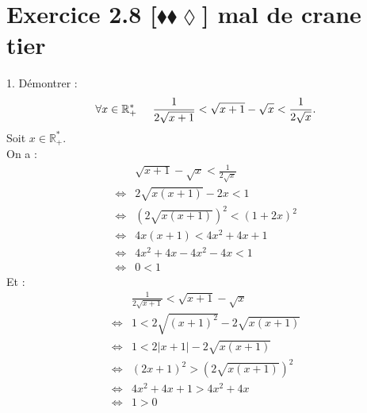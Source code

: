 \documentclass[10pt]{article}
\begin{document}
\section*{Exercice 2.8 [$\blacklozenge\blacklozenge\lozenge$] mal de crane tier}
\begin{tcolorbox}[enhanced, width=6in, center, size=fbox, fontupper=\large, drop shadow southwest]
    1. Démontrer : 
    \begin{equation*}
        \forall{x\in\mathbb{R}^*_+}\hspace{0.5cm}\frac{1}{2\sqrt{x+1}}<\sqrt{x+1}-\sqrt{x}<\frac{1}{2\sqrt{x}}.
    \end{equation*}
    Soit $x\in\mathbb{R}^*_+$.\\
    On a :
    \begin{align*}
        &\sqrt{x+1}-\sqrt{x}<\frac{1}{2\sqrt{x}}\\
        \iff&2\sqrt{x(x+1)}-2x<1\\
        \iff&(2\sqrt{x(x+1)})^2<(1+2x)^2\\
        \iff&4x(x+1)<4x^2+4x+1\\
        \iff&4x^2+4x-4x^2-4x<1\\
        \iff&0<1
    \end{align*}
    Et :
    \begin{align*}
        &\frac{1}{2\sqrt{x+1}}<\sqrt{x+1}-\sqrt{x}\\
        \iff&1<2\sqrt{(x+1)^2}-2\sqrt{x(x+1)}\\
        \iff&1<2|x+1|-2\sqrt{x(x+1)}\\
        \iff&(2x+1)^2>(2\sqrt{x(x+1)})^2\\
        \iff&4x^2+4x+1>4x^2+4x\\
        \iff&1>0
    \end{align*}
\end{tcolorbox}
\end{document}
